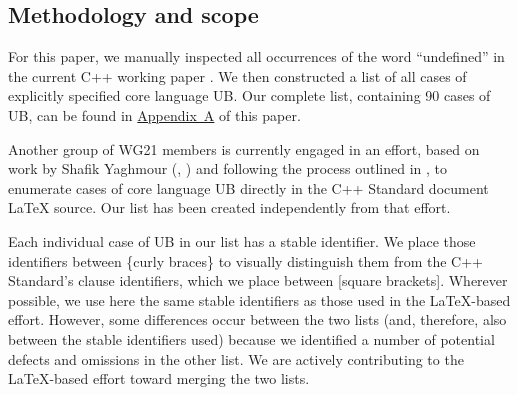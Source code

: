 

\subsection{Methodology and scope}

For this paper, we manually inspected all occurrences of the word ``undefined'' in the current C++ working paper \cite{N5008}. We then constructed a list of all cases of explicitly specified core language UB. Our complete list, containing 90 cases of UB, can be found in \hyperref[appendix]{Appendix~A} of this paper. 

Another group of WG21 members is currently engaged in an effort, based on work by Shafik Yaghmour (\cite{P1705R1}, \cite{P3075R0}) and following the process outlined in \cite{P3656R1}, to enumerate cases of core language UB directly in the C++ Standard document  \LaTeX{} source. Our list has been created independently from that effort.

Each individual case of UB in our list has a stable identifier. We place those identifiers between \{curly braces\} to visually distinguish them from the C++ Standard's clause identifiers, which we place between [square brackets]. Wherever possible, we use here the same stable identifiers as those used in the \LaTeX-based effort. However, some differences occur between the two lists (and, therefore, also between the stable identifiers used) because we identified a number of potential defects and omissions in the other list. We are actively contributing to the \LaTeX-based effort toward merging the two lists. 


